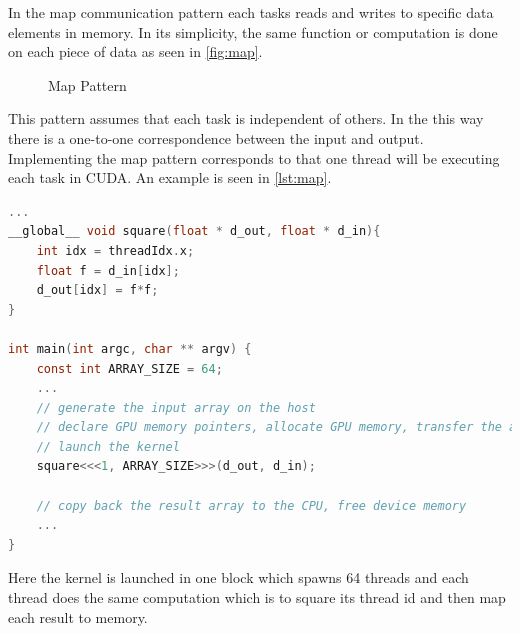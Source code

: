 In the map communication pattern each tasks reads and writes to specific data elements in memory.
In its simplicity, the same function or computation is done on each piece of data as seen in \autoref{fig:map}.

\begin{figure}[ht]
	\centering
	\caption{Map Pattern}
	\label{fig:map}
\end{figure}
This pattern assumes that each task is independent of others.
In the this way there is a one-to-one correspondence between the input and output.
Implementing the map pattern corresponds to that one thread will be executing each task in CUDA.
An example is seen in \autoref{lst:map}.
\FloatBarrier
\begin{lstlisting}[language=C,caption={Squaring thread id using map pattern},label=lst:map]
...
__global__ void square(float * d_out, float * d_in){
	int idx = threadIdx.x;
	float f = d_in[idx];
	d_out[idx] = f*f; 	
}

int main(int argc, char ** argv) {
	const int ARRAY_SIZE = 64;
	...
	// generate the input array on the host
	// declare GPU memory pointers, allocate GPU memory, transfer the array to the GPU
	// launch the kernel
	square<<<1, ARRAY_SIZE>>>(d_out, d_in);

	// copy back the result array to the CPU, free device memory
	...
}
\end{lstlisting}


Here the kernel is launched in one block which spawns 64 threads and each thread does the same computation which is to square its thread id and then map each result to memory.